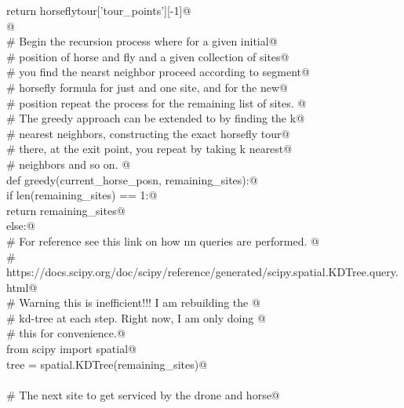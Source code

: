 \documentclass[11.5pt]{report}
\begin{document}
\begin{flushleft}
\begin{list}{}{}
\mbox{}\verb@            return horseflytour['tour_points'][-1]@\\
\mbox{}\verb@      @\\
\mbox{}\verb@      # Begin the recursion process where for a given initial@\\
\mbox{}\verb@      # position of horse and fly and a given collection of sites@\\
\mbox{}\verb@      # you find the nearst neighbor proceed according to segment@\\
\mbox{}\verb@      # horsefly formula for just and one site, and for the new@\\
\mbox{}\verb@      # position repeat the process for the remaining list of sites. @\\
\mbox{}\verb@      # The greedy approach can be extended to by finding the k@\\
\mbox{}\verb@      # nearest neighbors, constructing the exact horsefly tour@\\
\mbox{}\verb@      # there, at the exit point, you repeat by taking k nearest@\\
\mbox{}\verb@      # neighbors and so on. @\\
\mbox{}\verb@      def greedy(current_horse_posn, remaining_sites):@\\
\mbox{}\verb@            if len(remaining_sites) == 1:@\\
\mbox{}\verb@                  return remaining_sites@\\
\mbox{}\verb@            else:@\\
\mbox{}\verb@                  # For reference see this link on how nn queries are performed. @\\
\mbox{}\verb@                  # https://docs.scipy.org/doc/scipy/reference/generated/scipy.spatial.KDTree.query.html@\\
\mbox{}\verb@                  # Warning this is inefficient!!! I am rebuilding the @\\
\mbox{}\verb@                  # kd-tree at each step. Right now, I am only doing @\\
\mbox{}\verb@                  # this for convenience.@\\
\mbox{}\verb@                  from scipy import spatial@\\
\mbox{}\verb@                  tree = spatial.KDTree(remaining_sites)@\\
\mbox{}\verb@@\\
\mbox{}\verb@                  # The next site to get serviced by the drone and horse@\\

\end{list}
\end{flushleft}
\end{document}

